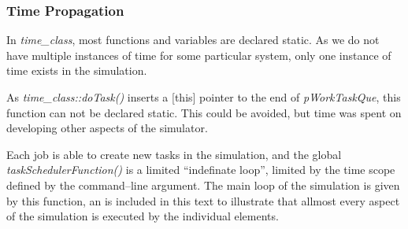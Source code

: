 	\subsubsection{Time Propagation}
	In \emph{time\_class}, most functions and variables are declared static. 
	As we do not have multiple instances of time for some particular system, only one instance of time exists in the simulation.
	
	As \emph{time\_class::doTask()} inserts a [this] pointer to the end of \emph{pWorkTaskQue}, this function can not be declared static. %
	This could be avoided, but time was spent on developing other aspects of the simulator.

	Each job is able to create new tasks in the simulation, and the global \emph{taskSchedulerFunction()} is a limited ``indefinate loop'', limited by the time scope defined by the command--line argument.
	The main loop of the simulation is given by this function, an is included in this text to illustrate that allmost every aspect of the simulation is executed by the individual elements.


